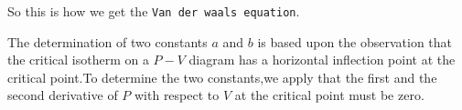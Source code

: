 \documentclass{article}
\begin{document}
So this is how we get the \texttt{Van der waals equation}.

The determination of two constants $a$ and $b$ is based upon the observation that the critical isotherm on a $P-V$ diagram has a horizontal inflection point at the critical point.To determine the two constants,we apply that the first and the second derivative of $P$ with respect to $V$ at the critical point must be zero. 
\end{document}
